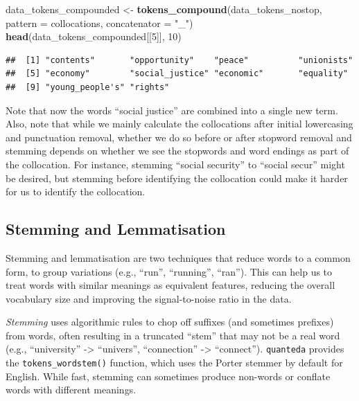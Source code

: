 \documentclass[
]{book}
\newenvironment{Shaded}{\begin{snugshade}}{\end{snugshade}}
\newcommand{\AttributeTok}[1]{\textcolor[rgb]{0.13,0.29,0.53}{#1}}
\newcommand{\DecValTok}[1]{\textcolor[rgb]{0.00,0.00,0.81}{#1}}
\newcommand{\FunctionTok}[1]{\textcolor[rgb]{0.13,0.29,0.53}{\textbf{#1}}}
\newcommand{\NormalTok}[1]{#1}
\newcommand{\OtherTok}[1]{\textcolor[rgb]{0.56,0.35,0.01}{#1}}
\newcommand{\StringTok}[1]{\textcolor[rgb]{0.31,0.60,0.02}{#1}}
\begin{document}
\begin{Shaded}
\begin{Highlighting}[]
\NormalTok{data\_tokens\_compounded }\OtherTok{\textless{}{-}} \FunctionTok{tokens\_compound}\NormalTok{(data\_tokens\_nostop, }\AttributeTok{pattern =}\NormalTok{ collocations,}
    \AttributeTok{concatenator =} \StringTok{"\_"}\NormalTok{)}
\FunctionTok{head}\NormalTok{(data\_tokens\_compounded[[}\DecValTok{5}\NormalTok{]], }\DecValTok{10}\NormalTok{)}
\end{Highlighting}
\end{Shaded}

\begin{verbatim}
##  [1] "contents"       "opportunity"    "peace"          "unionists"     
##  [5] "economy"        "social_justice" "economic"       "equality"      
##  [9] "young_people's" "rights"
\end{verbatim}

Note that now the words ``social justice'' are combined into a single new term. Also, note that while we mainly calculate the collocations after initial lowercasing and punctuation removal, whether we do so before or after stopword removal and stemming depends on whether we see the stopwords and word endings as part of the collocation. For instance, stemming ``social security'' to ``social secur'' might be desired, but stemming before identifying the collocation could make it harder for us to identify the collocation.

\subsection{Stemming and Lemmatisation}\label{stemming-and-lemmatisation}

Stemming and lemmatisation are two techniques that reduce words to a common form, to group variations (e.g., ``run'', ``running'', ``ran''). This can help us to treat words with similar meanings as equivalent features, reducing the overall vocabulary size and improving the signal-to-noise ratio in the data.

\emph{Stemming} uses algorithmic rules to chop off suffixes (and sometimes prefixes) from words, often resulting in a truncated ``stem'' that may not be a real word (e.g., ``university'' -\textgreater{} ``univers'', ``connection'' -\textgreater{} ``connect''). \texttt{quanteda} provides the \texttt{tokens\_wordstem()} function, which uses the Porter stemmer by default for English. While fast, stemming can sometimes produce non-words or conflate words with different meanings.
\end{document}
